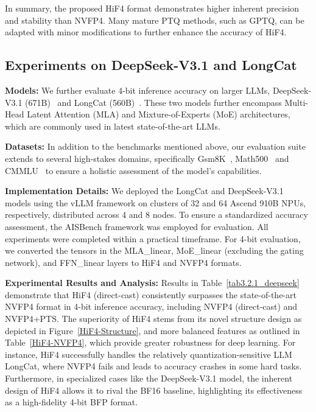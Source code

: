 In summary, the proposed HiF4 format demonstrates higher inherent 
precision and stability than NVFP4. 
Many mature PTQ methods, such as GPTQ, can be adapted with minor 
modifications to further enhance the accuracy of HiF4. 


\subsection{Experiments on DeepSeek-V3.1 and LongCat} 

\noindent\textbf{Models:} 
We further evaluate 4-bit inference 
accuracy on larger LLMs, DeepSeek-V3.1 (671B)~\cite{Liu2024} 
and LongCat (560B)~\cite{Team2025}. 
These two models further encompass Multi-Head Latent Attention 
(MLA) and Mixture-of-Experts (MoE) architectures, 
which are commonly used in latest state-of-the-art LLMs. 

\noindent\textbf{Datasets:} 
In addition to the benchmarks mentioned above, 
our evaluation suite extends to several high-stakes domains, 
specifically Gsm8K~\cite{Cobbe2021}, 
Math500~\cite{Hendrycks2021a} 
and CMMLU~\cite{Li2024a} 
to ensure a holistic assessment of the model's capabilities. 

\noindent\textbf{Implementation Details:} 
We deployed the LongCat and DeepSeek-V3.1 models using the vLLM 
framework on clusters of 32 and 64 Ascend 910B NPUs, 
respectively, distributed across 4 and 8 nodes. 
To ensure a standardized accuracy assessment, 
the AISBench framework was employed for evaluation. 
All experiments were completed within a practical timeframe. 
For 4-bit evaluation, we converted the tensors in the MLA\_linear, 
MoE\_linear (excluding the gating network), and FFN\_linear layers 
to HiF4 and NVFP4 formats. 

\noindent\textbf{Experimental Results and Analysis:} 
Results in Table~\ref{tab3.2.1_deepseek} demonstrate that 
HiF4 (direct-cast) consistently surpasses the state-of-the-art 
NVFP4 format in 4-bit inference accuracy, 
including NVFP4 (direct-cast) and NVFP4+PTS. 
The superiority of HiF4 stems from its novel structure design 
as depicted in Figure~\ref{HiF4-Structure}, 
and more balanced features as outlined in Table~\ref{HiF4-NVFP4}, 
which provide greater robustness for deep learning. 
For instance, HiF4 successfully handles the relatively  
quantization-sensitive LLM LongCat, where NVFP4 fails and leads 
to accuracy crashes in some hard tasks.  
Furthermore, in specialized cases like the DeepSeek-V3.1 model, 
the inherent design of HiF4 allows it to rival the BF16 
baseline, highlighting its effectiveness as a high-fidelity 
4-bit BFP format. 

